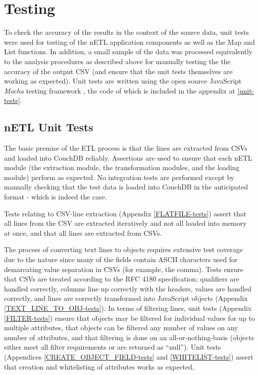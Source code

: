 \section{Testing}
To check the accuracy of the results in the context of the source data, unit tests were used for testing of the nETL application components as well as the Map and List functions. In addition, a small sample of the data was processed equivalently to the analysis procedures as described above for manually testing the the accuracy of the output CSV (and ensure that the unit tests themselves are working as expected). Unit tests are written using the open source JavaScript \textit{Mocha} testing framework \cite{mochaTest}, the code of which is included in the appendix at \ref{unit-tests}.

\subsection{nETL Unit Tests}
The basic premise of the ETL process is that the lines are extracted from CSVs and loaded into CouchDB reliably. Assertions are used to ensure that each nETL module (the extraction module, the transformation modules, and the loading module) perform as expected. No integration tests are performed except by manually checking that the test data is loaded into CouchDB in the anticipated format - which is indeed the case.

Tests relating to CSV-line extraction (Appendix \ref{FLATFILE-tests}) assert that all lines from the CSV are extracted iteratively and not all loaded into memory at once, and that all lines are extracted from CSVs.

The process of converting text lines to objects requires extensive test coverage due to the nature since many of the fields contain ASCII characters used for demarcating value separation in CSVs (for example, the comma). Tests ensure that CSVs are treated according to the RFC 4180 specification; qualifiers are handled correctly, columns line up correctly with the headers, values are handled correctly, and lines are correctly transformed into JavaScript objects (Appendix \ref{TEXT_LINE_TO_OBJ-tests}). In terms of filtering lines, unit tests (Appendix \ref{FILTER-tests}) ensure that objects may be filtered for individual values for up to multiple attributes, that objects can be filtered any number of values on any number of attributes, and that filtering is done on an all-or-nothing-basis (objects either meet all filter requirements or are returned as ``null''). Unit tests (Appendices \ref{CREATE_OBJECT_FIELD-tests} and \ref{WHITELIST-tests}) assert that creation and whitelisting of attributes works as expected,

